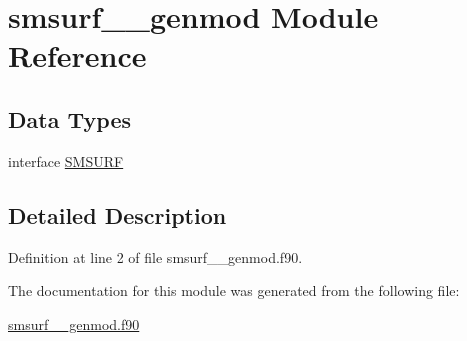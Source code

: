 \hypertarget{classsmsurf____genmod}{\section{smsurf\+\_\+\+\_\+genmod Module Reference}
\label{classsmsurf____genmod}
}
\subsection*{Data Types}
\begin{DoxyCompactItemize}
\item 
interface \hyperlink{interfacesmsurf____genmod_1_1SMSURF}{S\+M\+S\+U\+R\+F}
\end{DoxyCompactItemize}


\subsection{Detailed Description}


Definition at line 2 of file smsurf\+\_\+\+\_\+genmod.\+f90.



The documentation for this module was generated from the following file\+:\begin{DoxyCompactItemize}
\item 
\hyperlink{smsurf____genmod_8f90}{smsurf\+\_\+\+\_\+genmod.\+f90}\end{DoxyCompactItemize}
